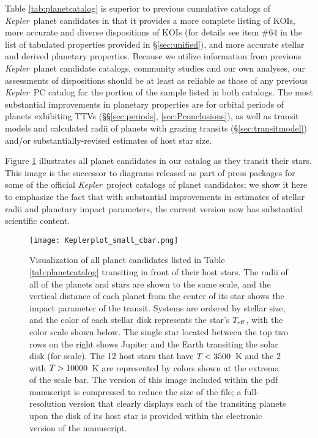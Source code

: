 \documentclass{aastex62}
\newcommand{\ik}{{\it Kepler~}}
\begin{document}
{Table \ref{tab:planetcatalog} is superior to previous cumulative catalogs of \ik planet candidates in that it provides a more complete listing of KOIs, more accurate and diverse dispositions of KOIs (for details see item \#64 in the list of tabulated properties provided in \S\ref{sec:unified}), and more accurate stellar and derived planetary properties. {Because we utilize information from previous \ik planet candidate catalogs, community studies and our own analyses, our assessments of dispositions should be at least as reliable as those of any previous \ik PC catalog for the portion of the sample listed in both catalogs.} The most substantial improvements in planetary properties are for orbital periods of planets exhibiting TTVs (\S\S\ref{sec:periods}, \ref{sec:Pconclusions}), as well as transit models and calculated radii of planets with grazing transits (\S\ref{sec:transitmodel}) and/or substantially-revised estimates of host star size.

Figure \ref{fig:transitingplanets} illustrates all planet candidates in our catalog as they transit their stars. This image is the successor to diagrams released as part of press packages for some of the official \ik project catalogs of planet candidates; we show it here to emphasize the fact that with substantial improvements in estimates of stellar radii and planetary impact parameters, the current version now has substantial scientific content.}

\begin{figure}
    \centering
    \texttt{[image: Keplerplot\_small\_cbar.png]}
    \caption{{Visualization of all planet candidates listed in Table \ref{tab:planetcatalog} transiting in front of their host stars.  The radii of all of the planets and stars are shown to the same scale, and the vertical distance of each planet from the center of its star shows the impact parameter of the transit. Systems are ordered by stellar size, and the color of each stellar disk represents the star's $T_{\rm eff}$, with the color scale shown below. The single star located between the top two rows on the right shows Jupiter and the Earth transiting the solar disk (for scale). The 12 host stars that have $T_{\rm} < 3500$~K and the 2 with $T_{\rm} > 10000$~K are represented by colors shown at the extrema of the scale bar. The version of this image included within the pdf manuscript is compressed to reduce the size of the file; a full-resolution version that clearly displays each of the transiting planets upon the disk of its host star is provided within the electronic version of the manuscript.}}%
    \label{fig:transitingplanets}
\end{figure}
\end{document}
